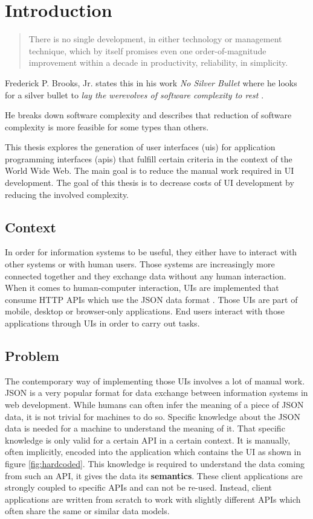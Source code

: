 \section{Introduction}\label{introduction}

\begin{quotation}
There is no single development, in either technology or management technique, which by itself promises even one order-of-magnitude improvement within a decade in productivity, reliability, in simplicity.
\end{quotation}

Frederick P. Brooks, Jr. states this in his work \textit{No Silver Bullet} where he looks for a silver bullet to \textit{lay the werevolves of software complexity to rest} \citep{nosilverbullet}.

He breaks down software complexity and describes that reduction of software complexity is more feasible for some types than others.

This thesis explores the generation of user interfaces (\gls{ui}s) for application programming interfaces (\gls{api}s) that fulfill certain criteria in the context of the World Wide Web. The main goal is to reduce the manual work required in UI development. The goal of this thesis is to decrease costs of UI development by reducing the involved complexity.

\subsection{Context}\label{context}
In order for information systems to be useful, they either have to interact with other systems or with human users. Those systems are increasingly more connected together and they exchange data without any human interaction. When it comes to human-computer interaction, UIs are implemented that consume HTTP APIs which use the JSON data format \citep{jsonformat}. Those UIs are part of mobile, desktop or browser-only applications. End users interact with those applications through UIs in order to carry out tasks.

\subsection{Problem}\label{problem}
The contemporary way of implementing those UIs involves a lot of manual work. JSON is a very popular format for data exchange between information systems in web development. While humans can often infer the meaning of a piece of JSON data, it is not trivial for machines to do so. Specific knowledge about the JSON data is needed for a machine to understand the meaning of it. That specific knowledge is only valid for a certain API in a certain context. It is manually, often implicitly, encoded into the application which contains the UI as shown in figure \ref{fig:hardcoded}. This knowledge is required to understand the data coming from such an API, it gives the data its \textbf{semantics}. These client applications are strongly coupled to specific APIs and can not be re-used. Instead, client applications are written from scratch to work with slightly different APIs which often share the same or similar data models.

